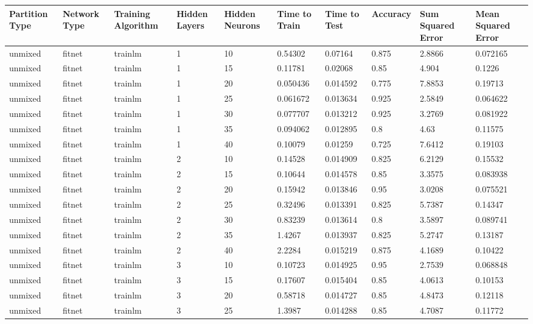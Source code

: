 \begin{longtable}{lllllllll}
Partition Type & Network Type & Training Algorithm & Hidden Layers & Hidden Neurons & Time to Train & Time to Test & Accuracy & Sum Squared Error & Mean Squared Error \\ \hline 
unmixed & fitnet & trainlm & 1 & 10 & 0.54302 & 0.07164 & 0.875 & 2.8866 & 0.072165 \\ \hline 
unmixed & fitnet & trainlm & 1 & 15 & 0.11781 & 0.02068 & 0.85 & 4.904 & 0.1226 \\ \hline 
unmixed & fitnet & trainlm & 1 & 20 & 0.050436 & 0.014592 & 0.775 & 7.8853 & 0.19713 \\ \hline 
unmixed & fitnet & trainlm & 1 & 25 & 0.061672 & 0.013634 & 0.925 & 2.5849 & 0.064622 \\ \hline 
unmixed & fitnet & trainlm & 1 & 30 & 0.077707 & 0.013212 & 0.925 & 3.2769 & 0.081922 \\ \hline 
unmixed & fitnet & trainlm & 1 & 35 & 0.094062 & 0.012895 & 0.8 & 4.63 & 0.11575 \\ \hline 
unmixed & fitnet & trainlm & 1 & 40 & 0.10079 & 0.01259 & 0.725 & 7.6412 & 0.19103 \\ \hline 
unmixed & fitnet & trainlm & 2 & 10 & 0.14528 & 0.014909 & 0.825 & 6.2129 & 0.15532 \\ \hline 
unmixed & fitnet & trainlm & 2 & 15 & 0.10644 & 0.014578 & 0.85 & 3.3575 & 0.083938 \\ \hline 
unmixed & fitnet & trainlm & 2 & 20 & 0.15942 & 0.013846 & 0.95 & 3.0208 & 0.075521 \\ \hline 
unmixed & fitnet & trainlm & 2 & 25 & 0.32496 & 0.013391 & 0.825 & 5.7387 & 0.14347 \\ \hline 
unmixed & fitnet & trainlm & 2 & 30 & 0.83239 & 0.013614 & 0.8 & 3.5897 & 0.089741 \\ \hline 
unmixed & fitnet & trainlm & 2 & 35 & 1.4267 & 0.013937 & 0.825 & 5.2747 & 0.13187 \\ \hline 
unmixed & fitnet & trainlm & 2 & 40 & 2.2284 & 0.015219 & 0.875 & 4.1689 & 0.10422 \\ \hline 
unmixed & fitnet & trainlm & 3 & 10 & 0.10723 & 0.014925 & 0.95 & 2.7539 & 0.068848 \\ \hline 
unmixed & fitnet & trainlm & 3 & 15 & 0.17607 & 0.015404 & 0.85 & 4.0613 & 0.10153 \\ \hline 
unmixed & fitnet & trainlm & 3 & 20 & 0.58718 & 0.014727 & 0.85 & 4.8473 & 0.12118 \\ \hline 
unmixed & fitnet & trainlm & 3 & 25 & 1.3987 & 0.014288 & 0.85 & 4.7087 & 0.11772 \\ \hline 

\end{longtable}
